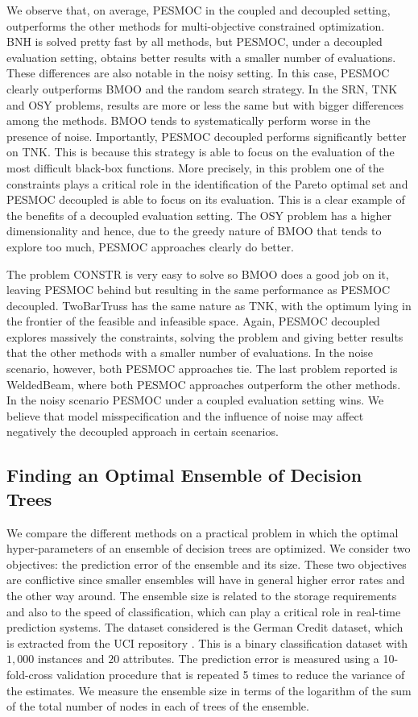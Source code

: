 \documentclass[review,preprint,12pt]{elsarticle}
\begin{document}
We observe that, on average, PESMOC in the coupled and decoupled setting, outperforms the other 
methods for multi-objective constrained optimization. BNH is solved pretty fast by all methods, 
but PESMOC, under a decoupled evaluation setting, obtains better results with a smaller number of evaluations.
These differences are also notable in the noisy setting. In this case, PESMOC clearly outperforms BMOO and the 
random search strategy. In the SRN, TNK and OSY problems, results are more or less the same but with bigger 
differences among the methods. BMOO tends to systematically perform worse in the presence of noise. 
Importantly, PESMOC decoupled performs significantly better on TNK. This is because this 
strategy is able to focus on the evaluation of the most difficult black-box functions. 
More precisely, in this problem one of the constraints plays a critical role in the 
identification of the Pareto optimal set and PESMOC decoupled is able to focus on 
its evaluation. This is a clear example of the benefits of a decoupled evaluation setting.
The OSY problem has a higher dimensionality and hence, due to the greedy nature of BMOO that tends 
to explore too much, PESMOC approaches clearly do better. 

The problem CONSTR is very easy to solve so BMOO does a good job on it, leaving PESMOC behind 
but resulting in the same performance as PESMOC decoupled.  TwoBarTruss has the 
same nature as TNK, with the optimum lying in the frontier of the feasible and infeasible space. Again, 
PESMOC decoupled explores massively the constraints, solving the problem and giving better results that 
the other methods with a smaller number of evaluations. In the noise scenario, however, both PESMOC 
approaches tie. The last problem reported is WeldedBeam, where both PESMOC approaches outperform the other methods. 
In the noisy scenario PESMOC under a coupled evaluation setting wins. We believe that model misspecification
and the influence of noise may affect negatively the decoupled approach in certain scenarios. 

\subsection{Finding an Optimal Ensemble of Decision Trees}

We compare the different methods on a practical problem in which the optimal hyper-parameters of an
ensemble of decision trees are optimized. We consider two objectives: the prediction error of the
ensemble and its size. These two objectives are conflictive since smaller ensembles will have in general
higher error rates and the other way around. The ensemble size is related to the storage requirements and
also to the speed of classification, which can play a critical role in real-time prediction systems.
The dataset considered is the German Credit dataset, which is extracted from the UCI repository \citep{Dua2017}. 
This is a binary classification dataset with $1,000$ instances and $20$ attributes. The prediction error is 
measured using a 10-fold-cross validation procedure that is repeated 5 times to reduce the variance of the estimates.
We measure the ensemble size in terms of the logarithm of the sum of the total number of nodes in each of trees of 
the ensemble.
\end{document}
